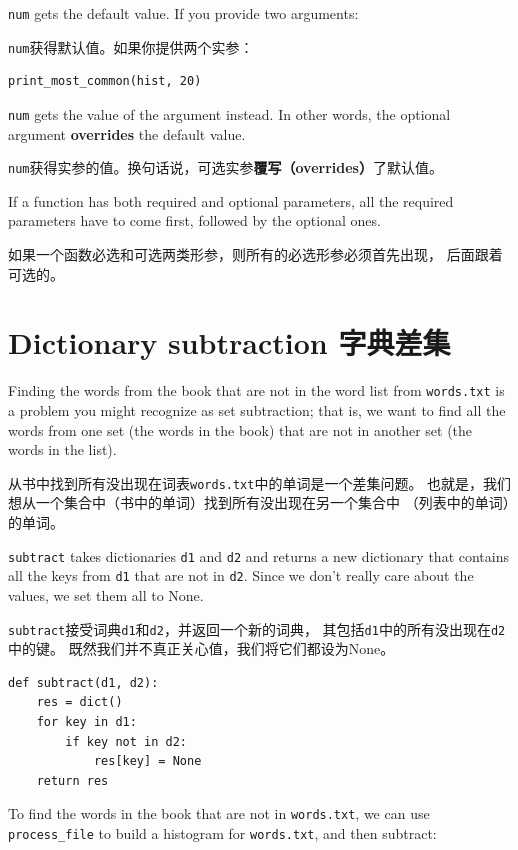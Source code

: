 \documentclass[10pt]{book}
\begin{document}
\begin{CJK}{UTF8}{gbsn}
{\tt num} gets the default value.  If you provide two arguments:

{\tt num}获得默认值。如果你提供两个实参：

\begin{verbatim}
print_most_common(hist, 20)
\end{verbatim}

{\tt num} gets the value of the argument instead.  In other
words, the optional argument {\bf overrides} the default value.

{\tt num}获得实参的值。换句话说，可选实参{\bf 覆写（overrides）}了默认值。

If a function has both required and optional parameters, all
the required parameters have to come first, followed by the
optional ones.

如果一个函数必选和可选两类形参，则所有的必选形参必须首先出现，
后面跟着可选的。

\section{Dictionary subtraction 字典差集}

Finding the words from the book that are not in the word list
from {\tt words.txt} is a problem you might recognize as set
subtraction; that is, we want to find all the words from one
set (the words in the book) that are not in another set (the
words in the list).

从书中找到所有没出现在词表{\tt words.txt}中的单词是一个差集问题。
也就是，我们想从一个集合中（书中的单词）找到所有没出现在另一个集合中
（列表中的单词）的单词。

{\tt subtract} takes dictionaries {\tt d1} and {\tt d2} and returns a
new dictionary that contains all the keys from {\tt d1} that are not
in {\tt d2}.  Since we don't really care about the values, we
set them all to None.

{\tt subtract}接受词典{\tt d1}和{\tt d2}，并返回一个新的词典，
其包括{\tt d1}中的所有没出现在{\tt d2}中的键。
既然我们并不真正关心值，我们将它们都设为None。

\begin{verbatim}
def subtract(d1, d2):
    res = dict()
    for key in d1:
        if key not in d2:
            res[key] = None
    return res
\end{verbatim}
%
To find the words in the book that are not in {\tt words.txt},
we can use \verb"process_file" to build a histogram for
{\tt words.txt}, and then subtract:


\end{CJK}
\end{document}
